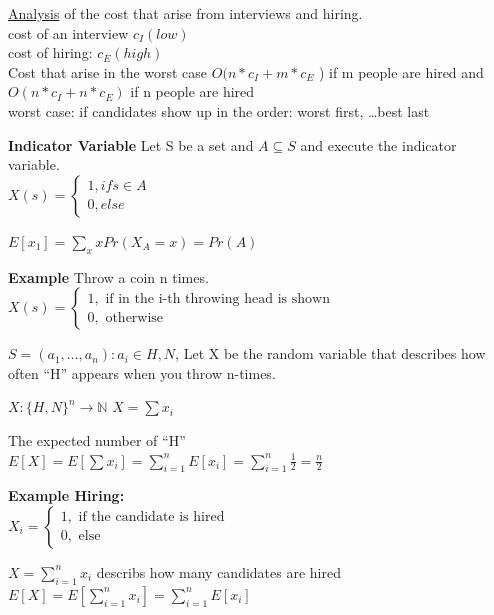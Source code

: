 \underline{Analysis} of the cost that arise from interviews and hiring.\\
cost of an interview $c{_I}(low)$\\
cost of hiring: $c{_E}(high)$\\
Cost that arise in the worst case $O(n* c{_I} +  m * c{_E}$ ) if m people are hired 
and \\
$O(n * c{_I} +  n *  c{_E} )$ if n people are hired \\
worst case: if candidates show up in the order: worst first, \ldots best last

\textbf{Indicator Variable}
Let S be a set and $A \subseteq S$ and execute the indicator variable.\\

$ X(s)=\left\{\begin{array}{cl} 1, if s\in A \\ 0, else \end{array}\right .$

$E[x{_1}] = \sum\limits_{x} x Pr(X{_A}=x) = Pr(A)$

\textbf{Example}
Throw a coin n times.
$ X(s)=\left\{\begin{array}{cl} 1, \mbox{ if in the i-th throwing head is shown} \\ 0, \mbox{  otherwise } \end{array}\right .$

$S = {(a{_1},\ldots,a{_n}) : a{_i} \in {H,N}}$,
Let X be the random variable that describes how often ``H'' appears when you throw n-times.

$X:\{H,N\}^n \rightarrow \mathbb{N}$
$X=\sum x{_i}$

The expected number of ``H''\\

$E[X] = E[\sum x{_i}] = \sum\limits_{i=1}^n E[x{_i}] = \sum\limits_{i=1}^n \frac{1}{2} = \frac{n}{2}$

\textbf{Example Hiring:}\\

$ X{_i} = \left\{\begin{array}{cl} 1, \mbox{ if the candidate is hired} \\ 0, \mbox{  else } \end{array}\right .$

$X= \sum\limits_{i=1}^n x{_i}$ describs how many candidates are hired\\

$E[X] =  E[\sum\limits_{i=1}^n x{_i}] = \sum\limits_{i=1}^n E[x{_i}]$\\

